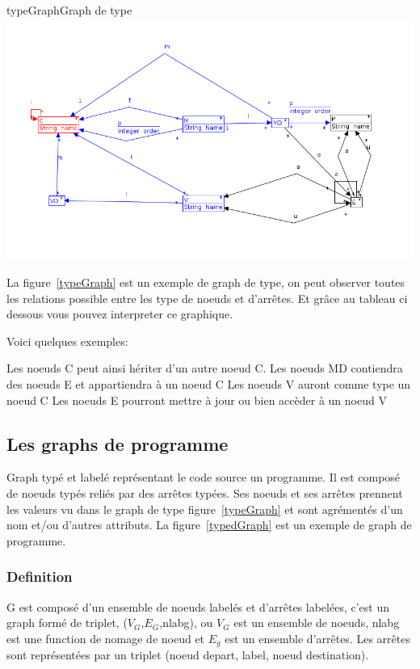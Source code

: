 \documentclass[a4paper, 12pt]{article}
\begin{document}
\begin{myfig}{typeGraph}{Graph de type}
\includegraphics[width=\textwidth]{typeGraph.png}
\end{myfig}

La figure~\ref{typeGraph} est un exemple de graph de type, on peut observer toutes les relations possible entre les type de noeuds et d'arrêtes.
Et grâce au tableau ci dessous vous pouvez interpreter ce graphique.

Voici quelques exemples:
\begin{enumerate}
Les noeuds C peut ainsi hériter d'un autre noeud C.
Les noeuds MD contiendra des noeuds E et appartiendra à un noeud C
Les noeuds V auront comme type un noeud C
Les noeuds E pourront mettre à jour ou bien accèder à un noeud V
\end{enumerate}


\subsection{Les graphs de programme} 

Graph typé et labelé représentant le code source un programme. Il est composé de noeuds typés reliés par des arrêtes typées. Ses noeuds et ses arrêtes prennent les valeurs vu dans le graph de type figure~\ref{typeGraph} et sont agrémentés d'un nom et/ou d'autres attributs. La figure~\ref{typedGraph} est un exemple de graph de programme.

\subsubsection{Definition}
G est composé d'un ensemble de noeuds labelés et d'arrêtes labelées, c'est un graph formé de triplet, ({$V_G$},{$E_G$},nlabg), ou {$V_G$} est un ensemble de noeuds, nlabg est une function de nomage de noeud et {$E_g$} est un ensemble d'arrêtes. Les arrêtes sont représentées par un triplet (noeud depart, label, noeud destination).
\end{document}
